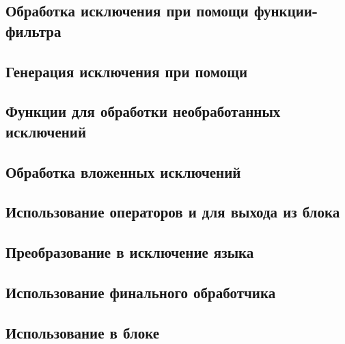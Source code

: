 
\subsection{Обработка исключения при помощи функции-фильтра}


\subsection{Генерация исключения при помощи }


\subsection{Функции для обработки необработанных исключений}


\subsection{Обработка вложенных исключений}


\subsection{Использование операторов  и  для выхода из блока }
\label{sec:gotoleave}


\subsection{Преобразование в исключение языка }


\subsection{Использование финального обработчика }


\subsection{Использование  в блоке }

